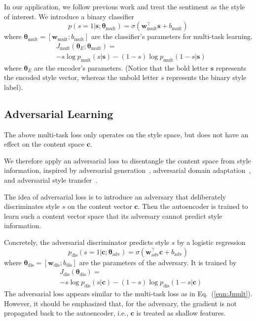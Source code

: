 \documentclass[11pt,a4paper]{article}
\begin{document}
In our application, we follow previous work \cite{hu2017toward,shen2017style,fu2017style} and treat the sentiment as the style of interest. We introduce a binary classifier
\begin{equation}
	p(s=1|\bm s;\bm\theta_\text{mult})=\sigma(\bm w_\text{mult}^\top \bm s + b_\text{mult})
\end{equation}
where $\bm\theta_\text{mult}=[\bm w_\text{mult}; b_\text{mult}]$ are the classifier's parameters for multi-task learning.
\begin{align} \label{eqn:Jmult}
	 & J_\text{mult}(\bm\theta_{E};\bm\theta_\text{mult})=                \\ \nonumber
	 & -s\log p_\text{mult}(s|\bm s) - (1-s)\log p_\text{mult}(1-s|\bm s)
\end{align}
where $\bm\theta_E$ are the encoder's parameters. (Notice that the bold letter $\bm s$ represents the encoded style vector, whereas the unbold letter $s$ represents the binary style label).


\subsection{Adversarial Learning} \label{ss:adv}

The above multi-task loss only operates on the style space, but does not have an effect on the content space $\bm c$.

We therefore apply an adversarial loss to disentangle the content space from style information, inspired by adversarial generation~\cite{goodfellow2014generative}, adversarial domain adaptation~\cite{liu2017adversarial}, and adversarial style transfer~\cite{fu2017style}.

The idea of adversarial loss is to introduce an adversary that deliberately discriminates style $s$ on the content vector $\bm c$. Then the autoencoder is trained to learn such a content vector space that its adversary cannot predict style information.

Concretely, the adversarial discriminator predicts style $s$ by a logistic regression
\begin{equation}
	p_\text{dis}(s=1|\bm c;\bm\theta_\text{adv})=\sigma(\bm w_\text{adv}^\top \bm c + b_\text{adv})
\end{equation}
where $\bm\theta_\text{dis}=[\bm w_\text{dis}; b_\text{dis}]$ are the parameters of the adversary. It is trained by
\begin{align}
	 & J_\text{dis}(\bm\theta_\text{dis})=                            \\ \nonumber
	 & -s\log p_\text{dis}(s|\bm c)-(1-s)\log p_\text{dis}(1-s|\bm c)
\end{align}
The adversarial loss appears similar to the multi-task loss as in Eq.~(\ref{eqn:Jmult}). However, it should be emphasized that, for the adversary, the gradient is not propagated back to the autoencoder, i.e., $\bm c$ is treated as shallow features.
\end{document}
